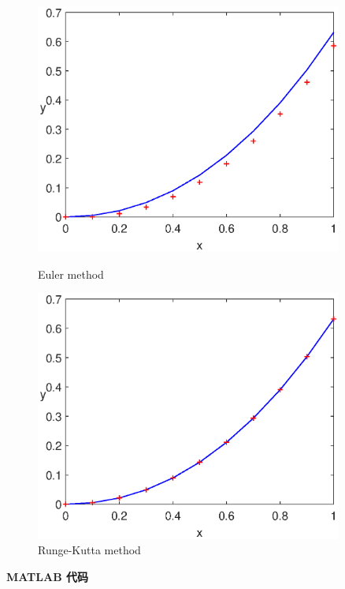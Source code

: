 \documentclass[12pt,cn]{homework}
\begin{document}
\begin{figure}[!htp]
\begin{minipage}[h]{0.48\linewidth}
\centering
\includegraphics[width=0.9\textwidth]{Euler}
\caption{Euler method}
\label{Testfun1}
\end{minipage}
\begin{minipage}[h]{0.48\linewidth}
\centering
\includegraphics[width=0.9\textwidth]{RungeKutta} %
\caption{Runge-Kutta method}
\label{Texstfun2}
\end{minipage}
\end{figure}

\clearpage
\noindent\textbf{MATLAB 代码}
\end{document}
